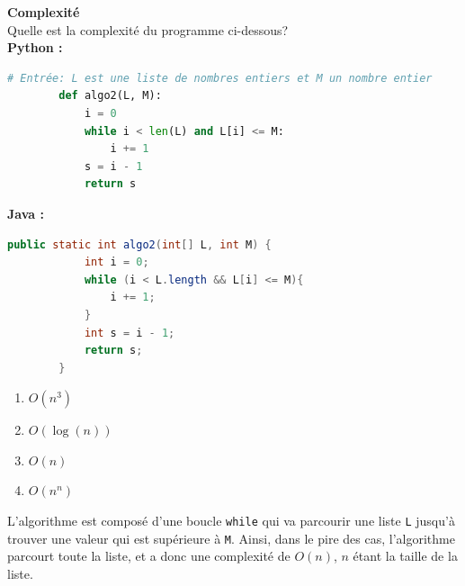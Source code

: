 \begin{Exercice}[10 minutes] \textbf{Complexité} \\
    Quelle est la complexité du programme ci-dessous?\\
    \textbf{Python :}
    \begin{lstlisting}[language=Python]
        # Entrée: L est une liste de nombres entiers et M un nombre entier
        def algo2(L, M):
            i = 0
            while i < len(L) and L[i] <= M:
                i += 1
            s = i - 1
            return s
    \end{lstlisting}
    
    \textbf{Java :}
    \begin{lstlisting}[language=Java]
        public static int algo2(int[] L, int M) {
            int i = 0;
            while (i < L.length && L[i] <= M){
                i += 1;
            }
            int s = i - 1;
            return s;
        }
    \end{lstlisting}

    \begin{enumerate}
        \item $O(n^3)$
        \item $O(\log(n))$
        \item $O(n)$
        \item $O(n^n)$
    \end{enumerate}

    \begin{solution}
    L'algorithme est composé d'une boucle \lstinline{while} qui va parcourir une liste \lstinline{L} jusqu'à trouver une valeur qui est supérieure à \lstinline{M}. Ainsi, dans le pire des cas, l'algorithme parcourt toute la liste, et a donc une complexité de $O(n)$, $n$ étant la taille de la liste.
    \end{solution}
\end{Exercice}
